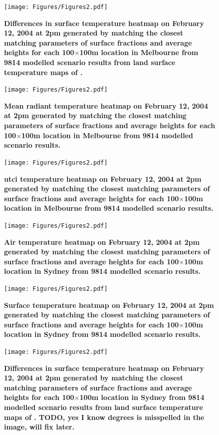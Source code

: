 \documentclass[final,3p,times,authoryear]{elsarticle}
\begin{document}
\begin{figure}
\centering
\texttt{[image: Figures/Figures2.pdf]}
\caption{\bf Differences in surface temperature heatmap on February 12, 2004 at 2pm generated by matching the closest matching parameters of surface fractions and average heights for each 100$\times$100m location in Melbourne from 9814 modelled scenario results from land surface temperature maps of \cite{Devereux2017}.  }
 \label{fig:TsfcDiffMelb}
\end{figure}


\begin{figure}
\centering
\texttt{[image: Figures/Figures2.pdf]}
\caption{\bf Mean radiant temperature heatmap on February 12, 2004 at 2pm generated by matching the closest matching parameters of surface fractions and average heights for each 100$\times$100m location in Melbourne from 9814 modelled scenario results.  }
 \label{fig:TmrtMelb}
\end{figure}



\begin{figure}
\centering
\texttt{[image: Figures/Figures2.pdf]}
\caption{\bf \gls{utci} temperature heatmap on February 12, 2004 at 2pm generated by matching the closest matching parameters of surface fractions and average heights for each 100$\times$100m location in Melbourne from 9814 modelled scenario results.  }
 \label{fig:utciMelb}
\end{figure}




\begin{figure}
\centering
\texttt{[image: Figures/Figures2.pdf]}
\caption{\bf Air temperature heatmap on February 12, 2004 at 2pm generated by matching the closest matching parameters of surface fractions and average heights for each 100$\times$100m location in Sydney from 9814 modelled scenario results.  }
 \label{fig:TaSyd}
\end{figure}

\begin{figure}
\centering
\texttt{[image: Figures/Figures2.pdf]}
\caption{\bf Surface temperature heatmap on February 12, 2004 at 2pm generated by matching the closest matching parameters of surface fractions and average heights for each 100$\times$100m location in Sydney from 9814 modelled scenario results.  }
 \label{fig:TsfcSyd}
\end{figure}

\begin{figure}
\centering
\texttt{[image: Figures/Figures2.pdf]}
\caption{\bf Differences in surface temperature heatmap on February 12, 2004 at 2pm generated by matching the closest matching parameters of surface fractions and average heights for each 100$\times$100m location in Sydney from 9814 modelled scenario results from land surface temperature maps of \cite{Devereux2017}. TODO, yes I know degrees is misspelled in the image, will fix later. }
 \label{fig:TsfcDiffSyd}
\end{figure}
\end{document}
